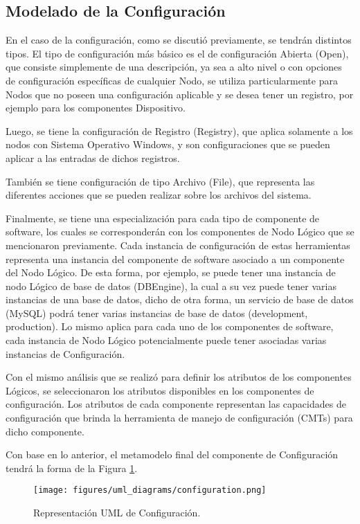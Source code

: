 \subsection{Modelado de la Configuración}
En el caso de la configuración, como se discutió previamente, se tendrán distintos tipos. El tipo de configuración más básico es el de configuración Abierta (Open), que consiste simplemente de una descripción, ya sea a alto nivel o con opciones de configuración específicas de cualquier Nodo, se utiliza particularmente para Nodos que no poseen una configuración aplicable y se desea tener un registro, por ejemplo para los componentes Dispositivo.

Luego, se tiene la configuración de Registro (Registry), que aplica solamente a los nodos con Sistema Operativo Windows, y son configuraciones que se pueden aplicar a las entradas de dichos registros.

También se tiene configuración de tipo Archivo (File), que representa las diferentes acciones que se pueden realizar sobre los archivos del sistema.

Finalmente, se tiene una especialización para cada tipo de componente de software, los cuales se corresponderán con los componentes de Nodo Lógico que se mencionaron previamente. 
Cada instancia de configuración de estas herramientas representa una instancia del componente de software asociado a un componente del Nodo Lógico. De esta forma, por ejemplo, se puede tener una instancia de nodo Lógico de base de datos (DBEngine), la cual a su vez puede tener varias instancias de una base de datos, dicho de otra forma, un servicio de base de datos (MySQL) podrá tener varias instancias de base de datos (development, production).
Lo mismo aplica para cada uno de los componentes de software, cada instancia de Nodo Lógico potencialmente puede tener asociadas varias instancias de Configuración.

Con el mismo análisis que se realizó para definir los atributos de los componentes Lógicos, se seleccionaron los atributos disponibles en los componentes de configuración. Los atributos de cada componente representan las capacidades de configuración que brinda la herramienta de manejo de configuración (CMTs) para dicho componente.

Con base en lo anterior, el metamodelo final del componente de Configuración tendrá la forma de la Figura \ref{fig:uml:configuration}.

\begin{figure}[htbp]
    \centering
    \texttt{[image: figures/uml\_diagrams/configuration.png]}
    \caption{Representación UML de Configuración.}
    \label{fig:uml:configuration}
\end{figure}

